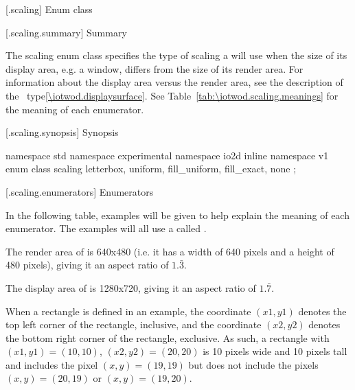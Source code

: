  [\iotwod.scaling] {Enum class }

 [\iotwod.scaling.summary] { Summary}

\pnum
The scaling enum class specifies the type of scaling a  
will use when the size of its display area, e.g. a window, differs from the 
size of its render area. For information about the display area versus the render area, see the description of the ~type\ref{\iotwod.displaysurface}. See 
Table~\ref{tab:\iotwod.scaling.meanings} for the meaning of each
 enumerator.

 [\iotwod.scaling.synopsis] { Synopsis}

\begin{codeblock}
namespace std { namespace experimental { namespace io2d { inline namespace v1 {
  enum class scaling {
    letterbox,
    uniform,
    fill_uniform,
    fill_exact,
    none
  };
} } } }
\end{codeblock}

 [\iotwod.scaling.enumerators] { Enumerators}

\pnum
\enternote
In the following table, examples will be given to help explain the meaning of each enumerator. The examples will all use a  called .

The render area of  is 640x480 (i.e. it has a width of 640 pixels and a height of 480 pixels), giving it an aspect ratio of $1.\bar{3}$.

The display area of  is 1280x720, giving it an aspect ratio of $1.\bar{7}$.

When a rectangle is defined in an example, the coordinate $(x1,y1)$ denotes the top left corner of the rectangle, inclusive, and the coordinate $(x2,y2)$ denotes the bottom right corner of the rectangle, exclusive. As such, a rectangle with $(x1,y1) = (10,10)$, $(x2,y2) = (20, 20)$ is 10 pixels wide and 10 pixels tall and includes the pixel $(x,y) = (19,19)$ but does not include the pixels $(x,y) = (20,19)$ or $(x,y) = (19,20)$.
\exitnote

